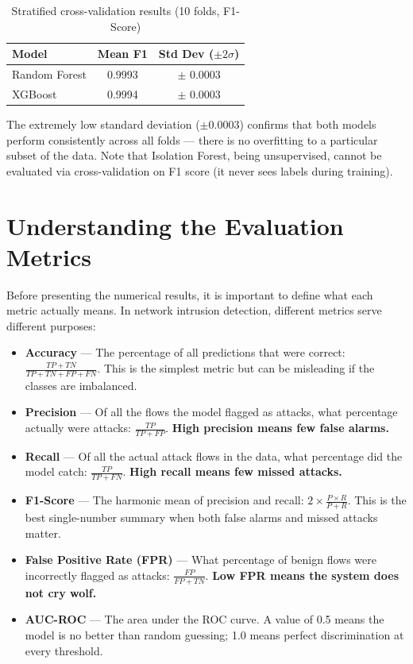 \begin{table}[H]
\centering
\caption{Stratified cross-validation results (10 folds, F1-Score)}
\label{tab:cv_results}
\begin{tabular}{lcc}
\toprule
\textbf{Model} & \textbf{Mean F1} & \textbf{Std Dev ($\pm 2\sigma$)} \\
\midrule
Random Forest & 0.9993 & $\pm$ 0.0003 \\
XGBoost & 0.9994 & $\pm$ 0.0003 \\
\bottomrule
\end{tabular}
\end{table}

The extremely low standard deviation ($\pm 0.0003$) confirms that both models perform consistently across all folds --- there is no overfitting to a particular subset of the data. Note that Isolation Forest, being unsupervised, cannot be evaluated via cross-validation on F1 score (it never sees labels during training).

\section{Understanding the Evaluation Metrics}

Before presenting the numerical results, it is important to define what each metric actually means. In network intrusion detection, different metrics serve different purposes:

\begin{itemize}
    \item \textbf{Accuracy} — The percentage of all predictions that were correct: $\frac{TP + TN}{TP + TN + FP + FN}$. This is the simplest metric but can be misleading if the classes are imbalanced.

    \item \textbf{Precision} — Of all the flows the model flagged as attacks, what percentage actually were attacks: $\frac{TP}{TP + FP}$. \textbf{High precision means few false alarms.}

    \item \textbf{Recall} — Of all the actual attack flows in the data, what percentage did the model catch: $\frac{TP}{TP + FN}$. \textbf{High recall means few missed attacks.}

    \item \textbf{F1-Score} — The harmonic mean of precision and recall: $2 \times \frac{P \times R}{P + R}$. This is the best single-number summary when both false alarms and missed attacks matter.

    \item \textbf{False Positive Rate (FPR)} — What percentage of benign flows were incorrectly flagged as attacks: $\frac{FP}{FP + TN}$. \textbf{Low FPR means the system does not cry wolf.}

    \item \textbf{AUC-ROC} — The area under the ROC curve. A value of 0.5 means the model is no better than random guessing; 1.0 means perfect discrimination at every threshold.
\end{itemize}

